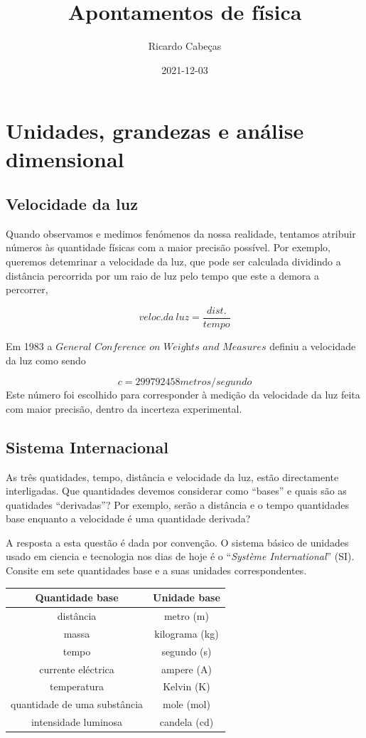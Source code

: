\documentclass[
  portuguese,
  ]{book}
\title{Apontamentos de física}
\author{Ricardo Cabeças}
\date{2021-12-03}
\begin{document}
\maketitle

{
\setcounter{tocdepth}{1}
\tableofcontents
}
\hypertarget{unidades-grandezas-e-anuxe1lise-dimensional}{%
\chapter{Unidades, grandezas e análise dimensional}\label{unidades-grandezas-e-anuxe1lise-dimensional}}

\hypertarget{velocidade-da-luz}{%
\section{Velocidade da luz}\label{velocidade-da-luz}}

Quando observamos e medimos fenómenos da nossa realidade, tentamos atribuir números às quantidade físicas com a maior precisão possível. Por exemplo, queremos detemrinar a velocidade da luz, que pode ser calculada dividindo a distância percorrida por um raio de luz pelo tempo que este a demora a percorrer,

\[veloc.da\ luz=\frac{dist.}{tempo}\]

Em 1983 a \(\textit{General Conference on Weights and Measures}\) definiu a velocidade da luz como sendo

\[c=299792458metros/segundo\]
Este número foi escolhido para corresponder à medição da velocidade da luz feita com maior precisão, dentro da incerteza experimental.

\hypertarget{sistema-internacional}{%
\section{Sistema Internacional}\label{sistema-internacional}}

As três quatidades, tempo, distância e velocidade da luz, estão directamente interligadas. Que quantidades devemos considerar como ``bases'' e quais são as quatidades ``derivadas''? Por exemplo, serão a distância e o tempo quantidades base enquanto a velocidade é uma quantidade derivada?

A resposta a esta questão é dada por convenção. O sistema básico de unidades usado em ciencia e tecnologia nos dias de hoje é o ``\emph{Système International}'' (SI). Consite em sete quantidades base e a suas unidades correspondentes.

\begin{longtable}[]{@{}cc@{}}
\toprule
Quantidade base & Unidade base\tabularnewline
\midrule
\endhead
distância & metro (m)\tabularnewline
massa & kilograma (kg)\tabularnewline
tempo & segundo (s)\tabularnewline
currente eléctrica & ampere (A)\tabularnewline
temperatura & Kelvin (K)\tabularnewline
quantidade de uma substância & mole (mol)\tabularnewline
intensidade luminosa & candela (cd)\tabularnewline
\bottomrule
\end{longtable}
\end{document}
